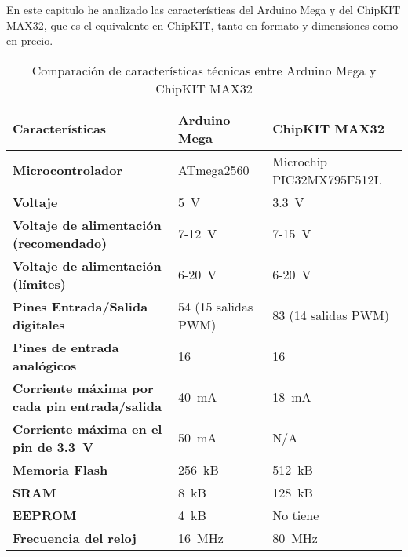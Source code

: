 



En este capitulo he analizado las características del Arduino Mega y del ChipKIT MAX32, que es el equivalente en ChipKIT, tanto en formato y dimensiones como en precio.

\begin{table}[hb]
\begin{center}
\begin{tabular}{lll}
  \textbf{Características}                                & \textbf{Arduino Mega}&\textbf{ChipKIT MAX32}\\
  \toprule
  \textbf{Microcontrolador}                               & ATmega2560          & Microchip PIC32MX795F512L\\
  \textbf{Voltaje}                                        & 5~V                 & 3.3~V\\
  \textbf{Voltaje de alimentación (recomendado)}          & 7-12~V              & 7-15~V\\
  \textbf{Voltaje de alimentación (límites)}              & 6-20~V              & 6-20~V\\
  \textbf{Pines Entrada/Salida digitales}                 & 54 (15 salidas PWM) & 83 (14 salidas PWM)\\
  \textbf{Pines de entrada analógicos}                    & 16                  & 16\\
  \textbf{Corriente máxima por cada pin entrada/salida}   & 40~mA               & 18~mA\\
  \textbf{Corriente máxima en el pin de 3.3~V}            & 50~mA               & N/A\\
  \textbf{Memoria Flash}                                  & 256~kB              & 512~kB\\
  \textbf{SRAM}                                           & 8~kB                & 128~kB\\
  \textbf{EEPROM}                                         & 4~kB                & No tiene\\
  \textbf{Frecuencia del reloj}                           & 16~MHz              & 80~MHz\\
\end{tabular}
\end{center}
\caption{Comparación de características técnicas entre Arduino Mega y ChipKIT MAX32}
\label{tab:comparacion_specs}
\end{table}

